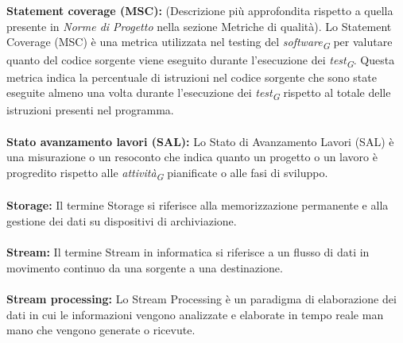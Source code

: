 \documentclass{article}
\begin{document}
\\
\\
\textbf{Statement coverage (MSC):} (Descrizione più approfondita rispetto a quella presente in \textit{Norme di Progetto} nella sezione Metriche di qualità). Lo Statement Coverage (MSC) è una metrica utilizzata nel testing del \textit{software}\textsubscript{\textit{G}} per valutare quanto del codice sorgente viene eseguito durante l'esecuzione dei \textit{test}\textsubscript{\textit{G}}.
Questa metrica indica la percentuale di istruzioni nel codice sorgente che sono state eseguite almeno una volta durante l'esecuzione dei \textit{test}\textsubscript{\textit{G}} rispetto al totale delle istruzioni presenti nel programma. 
\\
\\
\textbf{Stato avanzamento lavori (SAL):} Lo Stato di Avanzamento Lavori (SAL) è una misurazione o un resoconto che indica quanto un progetto o un lavoro è progredito rispetto alle \textit{attività}\textsubscript{\textit{G}} pianificate o alle fasi di sviluppo.
\\
\\
\textbf{Storage:} Il termine Storage si riferisce alla memorizzazione permanente e alla gestione dei dati su dispositivi di archiviazione.
\\
\\
\textbf{Stream:} Il termine Stream in informatica si riferisce a un flusso di dati in movimento continuo da una sorgente a una destinazione.
\\
\\
\textbf{Stream processing:} Lo Stream Processing è un paradigma di elaborazione dei dati in cui le informazioni vengono analizzate e elaborate in tempo reale man mano che vengono generate o ricevute.
\pagebreak
\end{document}
